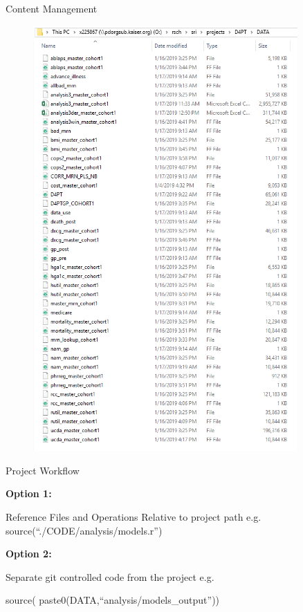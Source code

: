 \documentclass{beamer}
\begin{document}
\begin{frame}{Content Management}
\begin{minipage}{0.45\textwidth}
\begin{center}
\begin{figure}
\includegraphics[width=0.9\textwidth]{./shared_data.PNG}
\end{figure}
\end{center}
\end{minipage}

\end{frame}

\begin{frame}{Project Workflow}

\textbf{Option 1:}
\begin{center}
Reference Files and Operations Relative to project path e.g.\\
source(``./CODE/analysis/models.r'')
\end{center}
\bigskip

\textbf{Option 2:}
\begin{center}
Separate git controlled code from the project e.g.\\
\begin{small}
source( paste0(DATA,``analysis/models\_output''))
\end{small}
\end{center}
\bigskip

\end{frame}
\end{document}
